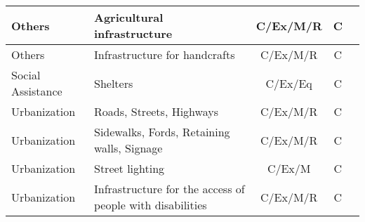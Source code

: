 \begin{tabular}{llccl}
		\vspace{0.1cm}
		Others & Agricultural infrastructure & C/Ex/M/R & C & 
		\\ 
		\hline
		
		\vspace{0.1cm}
		Others & Infrastructure for handcrafts & C/Ex/M/R & C &
		\\ 
		\hline
		
		\vspace{0.1cm}
		Social Assistance & Shelters & C/Ex/Eq & C & 
		\\
		\hline
		
		\vspace{0.1cm}
		Urbanization& Roads, Streets, Highways & C/Ex/M/R & C &
		\\ 
		\hline
		
		\vspace{0.1cm}
		Urbanization & Sidewalks, Fords, Retaining walls, Signage & C/Ex/M/R & C & 
		\\ 
		\hline
		
		\vspace{0.1cm}
		Urbanization & Street lighting & C/Ex/M & C & 
		\\ 
		\hline
		
		\vspace{0.1cm}
		Urbanization & Infrastructure for the access of people with disabilities & C/Ex/M/R & C &
		\\ 
		\hline
		
		\bottomrule
	\end{tabular}
	